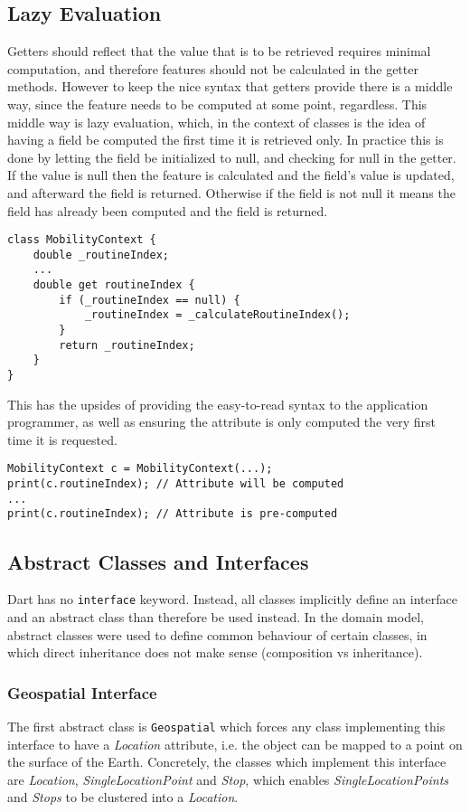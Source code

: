 \subsection{Lazy Evaluation}
Getters should reflect that the value that is to be retrieved requires minimal computation, and therefore features should not be calculated in the getter methods. However to keep the nice syntax that getters provide there is a middle way, since the feature needs to be computed at some point, regardless. This middle way is lazy evaluation, which, in the context of classes is the idea of having a field be computed the first time it is retrieved only. In practice this is done by letting the field be initialized to null, and checking for null in the getter. If the value is null then the feature is calculated and the field's value is updated, and afterward the field is returned. Otherwise if the field is not null it means the field has already been computed and the field is returned.

\begin{verbatim}
class MobilityContext {
    double _routineIndex;
    ...
    double get routineIndex {
        if (_routineIndex == null) {
            _routineIndex = _calculateRoutineIndex();
        }
        return _routineIndex;
    }
}
\end{verbatim}

This has the upsides of providing the easy-to-read syntax to the application programmer, as well as ensuring the attribute is only computed the very first time it is requested.

\begin{verbatim}
MobilityContext c = MobilityContext(...);
print(c.routineIndex); // Attribute will be computed
...
print(c.routineIndex); // Attribute is pre-computed
\end{verbatim}

\subsection{Abstract Classes and Interfaces}
Dart has no \verb|interface| keyword. Instead, all classes implicitly define an interface and an abstract class than therefore be used instead. In the domain model, abstract classes were used to define common behaviour of certain classes, in which direct inheritance does not make sense (composition vs inheritance). 

\subsubsection{Geospatial Interface}
The first abstract class is \verb|Geospatial| which forces any class implementing this interface to have a \textit{Location} attribute, i.e. the object can be mapped to a point on the surface of the Earth. Concretely, the classes which implement this interface are \textit{Location}, \textit{SingleLocationPoint} and \textit{Stop}, which enables \textit{SingleLocationPoints} and \textit{Stops} to be clustered into a \textit{Location}.

